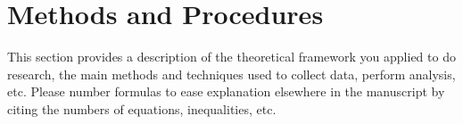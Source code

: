 \section{Methods and Procedures}
    This section provides a description of the theoretical framework you applied to do research, the main methods and techniques used to collect data, perform analysis, etc. Please number formulas to ease explanation elsewhere in the manuscript by citing the numbers of equations, inequalities, etc.